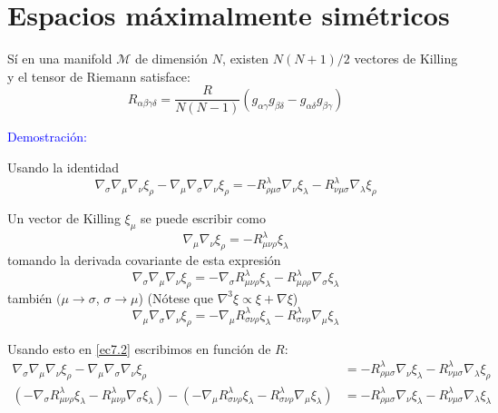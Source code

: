 \documentclass[../main]{subfiles}
\begin{document}
\section{Espacios máximalmente simétricos}

Sí en una manifold $\mathcal{M}$ de dimensión $N$, existen $N(N+1)/2$ vectores de Killing y el tensor de Riemann satisface:
\begin{equation}
    R_{\alpha\beta\gamma\delta}=\dfrac{R}{N(N-1)}(g_{\alpha\gamma}g_{\beta\delta}-g_{\alpha\delta}g_{\beta\gamma})
\end{equation}

\textcolor{blue}{Demostración:}

Usando la identidad
\begin{equation}
    \nabla_{\sigma}\nabla_{\mu}\nabla_{\nu}\xi_{\rho}-\nabla_{\mu}\nabla_{\sigma}\nabla_{\nu}\xi_{\rho} = -R^{\lambda}_{\rho\mu\sigma}\nabla_{\nu}\xi_{\lambda}-R^{\lambda}_{\nu\mu\sigma}\nabla_{\lambda}\xi_{\rho}
    \label{ec7.2}
\end{equation}

Un vector de Killing $\xi_{\mu}$ se puede escribir como 
\begin{equation}
    \nabla_{\mu}\nabla_{\nu}\xi_{\rho}=-R^{\lambda}_{\mu\nu\rho}\xi_{\lambda}
\end{equation}
tomando la derivada covariante de esta expresión
\begin{equation}
    \nabla_{\sigma}\nabla_{\mu}\nabla_{\nu}\xi_{\rho} = -\nabla_{\sigma}R^{\lambda}_{\mu\nu\rho}\xi_{\lambda}-R^{\lambda}_{\mu\rho\rho}\nabla_{\sigma}\xi_{\lambda}
\end{equation}
también $(\mu \rightarrow \sigma$, $\sigma \rightarrow \mu$) (Nótese que $\nabla^3 \xi \propto \xi+\nabla \xi$)
\begin{equation}
    \nabla_{\mu}\nabla_{\sigma}\nabla_{\nu}\xi_{\rho}=-\nabla_{\mu}R^{\lambda}_{\sigma\nu\rho}\xi_{\lambda}-R^{\lambda}_{\sigma\nu\rho}\nabla_{\mu}\xi_{\lambda}
\end{equation}

Usando esto en \eqref{ec7.2} escribimos en función de $R$:
\begin{equation}
    \begin{split}
        \nabla_{\sigma}\nabla_{\mu}\nabla_{\nu}\xi_{\rho}-\nabla_{\mu}\nabla_{\sigma}\nabla_{\nu}\xi_{\rho}&=-R^{\lambda}_{\rho\mu\sigma} \nabla_{\nu}\xi_{\lambda}-R^{\lambda}_{\nu\mu\sigma}\nabla_{\lambda}\xi_{\rho} \\
        (-\nabla_{\sigma}R^{\lambda}_{\mu\nu\rho}\xi_{\lambda}-R^{\lambda}_{\mu\nu\rho}\nabla_{\sigma}\xi_{\lambda})-(-\nabla_{\mu}R^{\lambda}_{\sigma\nu\rho}\xi_{\lambda}-R^{\lambda}_{\sigma\nu\rho}\nabla_{\mu}\xi_{\lambda})&=-R^{\lambda}_{\rho\mu\sigma}\nabla_{\nu}\xi_{\lambda}-R^{\lambda}_{\nu\mu\sigma}\nabla_{\lambda}\xi_{\lambda}
    \end{split}
\end{equation}
\end{document}
